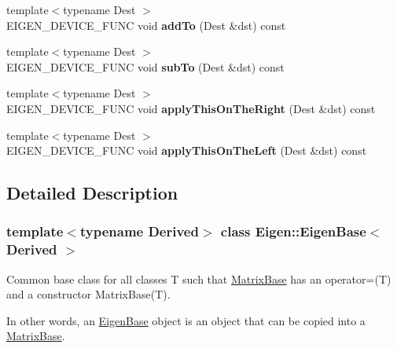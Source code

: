 \begin{DoxyCompactItemize}
\mbox{\label{struct_eigen_1_1_eigen_base_ad4300dbb47b34596d8ce6b2361c07b52}} 
{\footnotesize template$<$typename Dest $>$ }\\E\+I\+G\+E\+N\+\_\+\+D\+E\+V\+I\+C\+E\+\_\+\+F\+U\+NC void {\bfseries add\+To} (Dest \&dst) const
\item 
\mbox{\label{struct_eigen_1_1_eigen_base_a677a970c7d063d7033180dd9dbb53565}} 
{\footnotesize template$<$typename Dest $>$ }\\E\+I\+G\+E\+N\+\_\+\+D\+E\+V\+I\+C\+E\+\_\+\+F\+U\+NC void {\bfseries sub\+To} (Dest \&dst) const
\item 
\mbox{\label{struct_eigen_1_1_eigen_base_aabee6205996703a37df914e379472653}} 
{\footnotesize template$<$typename Dest $>$ }\\E\+I\+G\+E\+N\+\_\+\+D\+E\+V\+I\+C\+E\+\_\+\+F\+U\+NC void {\bfseries apply\+This\+On\+The\+Right} (Dest \&dst) const
\item 
\mbox{\label{struct_eigen_1_1_eigen_base_ac8a579c4f982dddd2a01489fe66b73c9}} 
{\footnotesize template$<$typename Dest $>$ }\\E\+I\+G\+E\+N\+\_\+\+D\+E\+V\+I\+C\+E\+\_\+\+F\+U\+NC void {\bfseries apply\+This\+On\+The\+Left} (Dest \&dst) const
\end{DoxyCompactItemize}


\subsection{Detailed Description}
\subsubsection*{template$<$typename Derived$>$\newline
class Eigen\+::\+Eigen\+Base$<$ Derived $>$}

Common base class for all classes T such that \mbox{\hyperlink{class_eigen_1_1_matrix_base}{Matrix\+Base}} has an operator=(\+T) and a constructor Matrix\+Base(\+T).

In other words, an \mbox{\hyperlink{struct_eigen_1_1_eigen_base}{Eigen\+Base}} object is an object that can be copied into a \mbox{\hyperlink{class_eigen_1_1_matrix_base}{Matrix\+Base}}.

